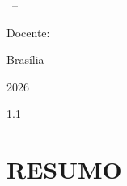 \thispagestyle{empty}

\begin{center}
{\small\instituicao\par}
{\small\unidadeacademica\par}
{\small\disciplina\ -- \semestre\par}

\vfill

{\bfseries\MakeUppercase{\titulorelatorio}\par}
\vspace{0.5cm}
{\subtitulorelatorio\par}

\vspace{1.2cm}
{\equipe\par}
\ifx\autores\equipe\else{\autores\par}\fi

\vspace{0.65cm}
{\small Docente: \docente\par}
\end{center}

\vfill
\begin{center}
{\small Brasília\par}
{\small 2026\par}
\end{center}

\clearpage

\thispagestyle{empty}
\begin{spacing}{1.1}
\tableofcontents
\end{spacing}

\clearpage
\setcounter{page}{1}
\section*{RESUMO}

